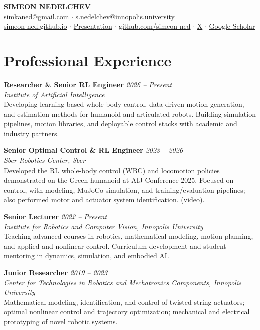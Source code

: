 \documentclass[11pt,a4paper]{article}
\newcommand{\cventry}[4]{%
  \textbf{#1} \hfill \textit{#2}\\
  \textit{#3}\\
  #4\par\vspace{0.25em}
}
\begin{document}
\begin{center}
  {\LARGE\bfseries SIMEON NEDELCHEV}\\[0.35em]
  \href{mailto:simkaned@gmail.com}{simkaned@gmail.com} \enspace$\cdot$\enspace
  \href{mailto:s.nedelchev@innopolis.university}{s.nedelchev@innopolis.university}\\[0.15em]
  \href{https://simeon-ned.github.io}{simeon-ned.github.io} \enspace$\cdot$\enspace
  \href{https://simeon-ned.github.io/presentations/template/}{Presentation} \enspace$\cdot$\enspace
  \href{https://github.com/simeon-ned}{github.com/simeon-ned} \enspace$\cdot$\enspace
  \href{https://x.com/simeon_ned}{X} \enspace$\cdot$\enspace
  \href{https://scholar.google.com/citations?user=Jl8IxhgAAAAJ}{Google Scholar}
\end{center}

\vspace{0.4em}

\section{Professional Experience}

\cventry{Researcher \& Senior RL Engineer}{2026 -- Present}{Institute of Artificial Intelligence}{%
  Developing learning-based whole-body control, data-driven motion generation, and estimation methods for humanoid and articulated robots. Building simulation pipelines, motion libraries, and deployable control stacks with academic and industry partners.}

\cventry{Senior Optimal Control \& RL Engineer}{2023 -- 2026}{Sber Robotics Center, Sber}{%
  Developed the RL whole-body control (WBC) and locomotion policies demonstrated on the Green humanoid at AIJ Conference 2025. Focused on control, with modeling, MuJoCo simulation, and training/evaluation pipelines; also performed motor and actuator system identification.%
  (\href{https://youtu.be/eehll8Uw3pw?t=1432}{video}).}

\cventry{Senior Lecturer}{2022 -- Present}{Institute for Robotics and Computer Vision, Innopolis University}{%
  Teaching advanced courses in robotics, mathematical modeling, motion planning, and applied and nonlinear control. Curriculum development and student mentoring in dynamics, simulation, and embodied AI.}

\cventry{Junior Researcher}{2019 -- 2023}{Center for Technologies in Robotics and Mechatronics Components, Innopolis University}{%
  Mathematical modeling, identification, and control of twisted-string actuators; optimal nonlinear control and trajectory optimization; mechanical and electrical prototyping of novel robotic systems.}
\end{document}
